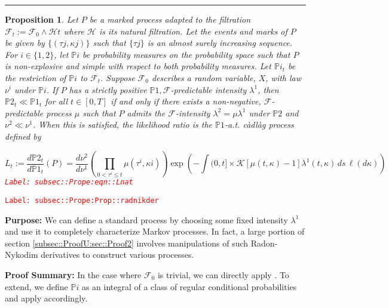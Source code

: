 \documentclass[12pt]{article}
\newcommand{\mb}{\mathbb}
\newcommand{\mc}{\mathcal}
\newcommand{\tr}{\textcolor{red}}
\newcommand{\labe}[1]{\tr{\texttt{Label: #1}}}
\newcommand{\purpose}{\textbf{Purpose: }}
\newcommand{\pfsum}{\textbf{Proof Summary: }}
\newcommand{\lin}{\rule{\linewidth}{0.4 pt}}
\newcommand{\pr}{\mb{P}}							%
\renewcommand{\t}{t}							%
\newcommand{\F}{\mc{F}}							%
\newcommand{\FH}{\mc{H}}						%
\newcommand{\X}{X}								%
\newcommand{\ts}[1]{_{#1}}						%
\newcommand{\rate}{\lambda}						%
\newcommand{\m}{\mu}							%
\newcommand{\mm}{\nu}							%
\newcommand{\rt}{\tau}							%
\renewcommand{\mark}{\kappa}					%
\newcommand{\rp}{P}								%
\newcommand{\mspce}{\mc{K}}						%
\newtheorem{prop}[thms]{Proposition}
\begin{document}
\lin

\begin{prop}
Let \(\rp\) be a marked process adapted to the filtration \(\F\ts{\t} := \F\ts{0}\wedge \FH{\t}\) where \(\FH\) is its natural filtration. Let the events and marks of \(\rp\) be given by \(\{(\rt{j},\mark{j})\}\) such that \(\{\rt{j}\}\) is an almost surely increasing sequence. For \(i \in \{1,2\}\), let \(\pr{i}\) be probability measures on the probability space such that \(\rp\) is non-explosive and simple with respect to both probability measures. Let \(\pr{i}_\t\) be the restriction of \(\pr{i}\) to \(\F\ts{\t}\). Suppose \(\F\ts{0}\) describes a random variable, \(\X\), with law \(\mm^i\) under \(\pr{i}\). If \(\rp\) has a strictly positive \(\pr{1},\F\)-predictable intensity \(\rate^1\), then \(\pr{2}_\t \ll \pr{1}_\t\) for all \(\t \in [0,T]\) if and only if there exists a non-negative, \(\F\)-predictable process \(\m\) such that \(\rp\) admits the \(\F\)-intensity \(\rate^2 = \m\rate^1\) under \(\pr{2}\) and \(\mm^2 \ll \mm^1\). When this is satisfied, the likelihood ratio is the \(\pr{1}\)-a.t. c\`adl\`ag process defined by 

\begin{equation}
L_\t:= \frac{d\pr{2}_\t}{d\pr{1}_\t}(\rp) = \frac{d\mm^2}{d\mm^1}\left(\prod_{0<\rt^i\leq \t} \m(\rt^i,\mark{i})\right)\exp\left(-\int{(0,\t]\times \mspce}[\m(\t,\mark) - 1]\rate^1(\t,\mark)\,ds\,\ell(d\mark)\right)
\label{subsec::Prope:eqn::Lnat}
\end{equation}
\labe{subsec::Prope:eqn::Lnat}
\label{subsec::Prope:Prop::radnikder}
\end{prop}
\labe{subsec::Prope:Prop::radnikder}

\purpose We can define a standard process by choosing some fixed intensity \(\rate^1\) and use it to completely characterize Markov processes. In fact, a large portion of section \ref{subsec::ProofU:sec::Proof2} involves manipulations of such Radon-Nykodim derivatives to construct various processes.

\pfsum In the case where \(\F\ts{0}\) is trivial, we can directly apply \cite[Theorem 14.4.I]{DalVer08}. To extend, we define \(\pr{i}\) as an integral of a class of regular conditional probabilities and apply \cite[Theorem 14.4.I]{DalVer08} accordingly.
\end{document}
